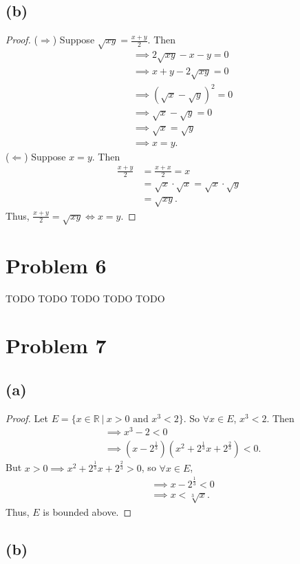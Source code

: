 \documentclass{article}
\begin{document}
\subsection*{(b)}
\begin{proof}
	($\Rightarrow$) Suppose $\sqrt{xy} = \frac{x+y}{2}$. Then
	\begin{align}
		&\implies 2\sqrt{xy} - x - y = 0 \\
		&\implies x + y - 2\sqrt{xy} = 0 \\
		&\implies \left(\sqrt{x} - \sqrt{y}\right)^2 = 0 \\
		&\implies \sqrt{x} - \sqrt{y} = 0 \\
		&\implies \sqrt{x} = \sqrt{y} \\
		&\implies x = y.
	\end{align}
	($\Leftarrow$) Suppose $x=y$. Then
	\begin{align}
		\frac{x+y}{2} &= \frac{x+x}{2} = x \\
		&= \sqrt{x}\cdot \sqrt{x} = \sqrt{x}\cdot \sqrt{y}\\
		&= \sqrt{xy}.
	\end{align}
	Thus, $\frac{x+y}{2}=\sqrt{xy} \iff x=y$.
\end{proof}

\section*{Problem 6}
TODO TODO TODO TODO TODO

\section*{Problem 7}
\subsection*{(a)}
\begin{proof}
	Let $E = \{x\in\mathbb{R} \: | \: x>0 \textrm{ and } x^3 < 2\}$. So $\forall x \in E$, $x^3 < 2$. Then
	\begin{align}
		&\implies x^3 - 2 < 0 \\
		&\implies \left(x-2^{\frac{1}{3}}\right)\left(x^2 + 2^{\frac{1}{3}}x + 2^{\frac{2}{3}}\right) < 0.
	\end{align}
	But $x>0 \implies x^2 + 2^{\frac{1}{3}}x + 2^{\frac{2}{3}} > 0$, so $\forall x \in E$, 
	\begin{align}
		&\implies x-2^{\frac{1}{3}} < 0 \\
		&\implies x < \sqrt[3]{x}.
	\end{align}
	Thus, $E$ is bounded above.
\end{proof}

\subsection*{(b)}
\end{document}

